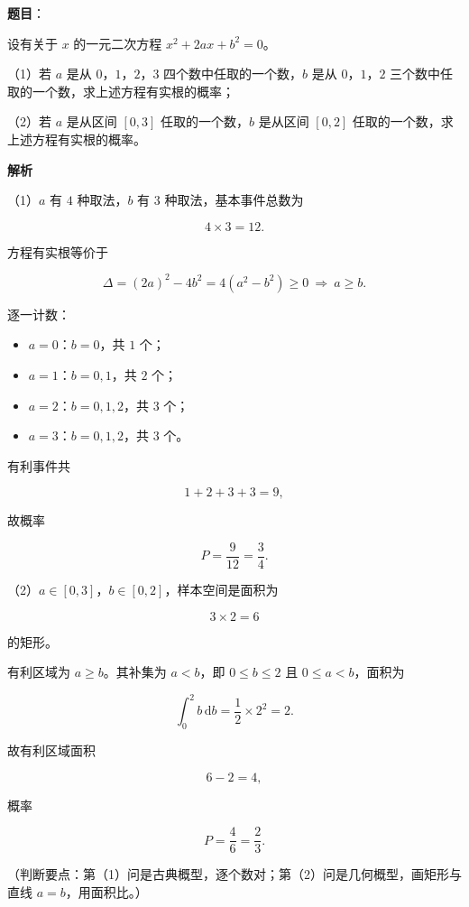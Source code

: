 \begin{answer}

\textbf{题目}：

设有关于 $x$ 的一元二次方程 $x^2+2ax+b^2=0$。

（1）若 $a$ 是从 $0$，$1$，$2$，$3$ 四个数中任取的一个数，$b$ 是从 $0$，$1$，$2$ 三个数中任取的一个数，求上述方程有实根的概率；

（2）若 $a$ 是从区间 $[0,3]$ 任取的一个数，$b$ 是从区间 $[0,2]$ 任取的一个数，求上述方程有实根的概率。

\textbf{解析}

（1）$a$ 有 $4$ 种取法，$b$ 有 $3$ 种取法，基本事件总数为

\nopagebreak[4]
\[4\times3=12.\]

方程有实根等价于

\nopagebreak[4]
\[\Delta=(2a)^2-4b^2=4(a^2-b^2)\geqslant0\ \Rightarrow\ a\geqslant b.\]

逐一计数：

\begin{itemize}
\item $a=0$：$b=0$，共 $1$ 个；
\item $a=1$：$b=0,1$，共 $2$ 个；
\item $a=2$：$b=0,1,2$，共 $3$ 个；
\item $a=3$：$b=0,1,2$，共 $3$ 个。
\end{itemize}

有利事件共

\nopagebreak[4]
\[1+2+3+3=9,\]

故概率

\nopagebreak[4]
\[P=\frac9{12}=\frac34.\]

（2）$a\in[0,3]$，$b\in[0,2]$，样本空间是面积为

\nopagebreak[4]
\[3\times2=6\]

的矩形。

有利区域为 $a\geqslant b$。其补集为 $a<b$，即 $0\leqslant b\leqslant2$ 且 $0\leqslant a<b$，面积为

\nopagebreak[4]
\[\int_0^2 b\,\mathrm db=\frac12\times2^2=2.\]

故有利区域面积

\nopagebreak[4]
\[6-2=4,\]

概率

\nopagebreak[4]
\[P=\frac46=\frac23.\]

（判断要点：第（1）问是古典概型，逐个数对；第（2）问是几何概型，画矩形与直线 $a=b$，用面积比。）


\end{answer}
